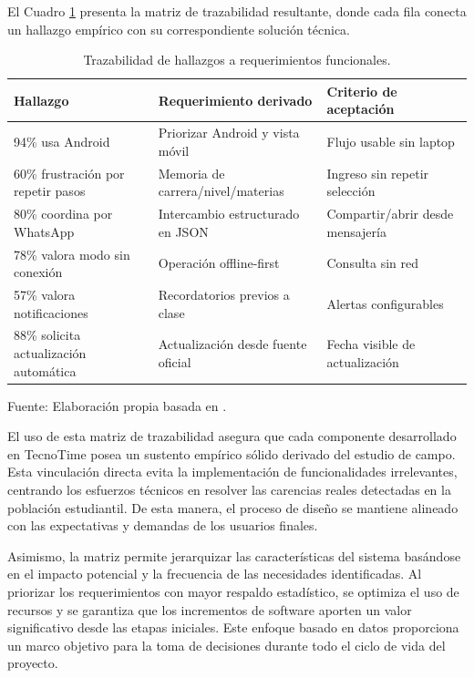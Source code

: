 El Cuadro \ref{tab:derivacion_req} presenta la matriz de trazabilidad resultante, donde cada fila conecta un hallazgo empírico con su correspondiente solución técnica.

\begin{table}[H]
\centering
\begin{tabularx}{\linewidth}{p{5.0cm} p{7.5cm} p{3.5cm}}
\toprule
Hallazgo & Requerimiento derivado & Criterio de aceptación \\
\midrule
94\% usa Android & Priorizar Android y vista móvil & Flujo usable sin laptop \\
60\% frustración por repetir pasos & Memoria de carrera/nivel/materias & Ingreso sin repetir selección \\
80\% coordina por WhatsApp & Intercambio estructurado en JSON & Compartir/abrir desde mensajería \\
78\% valora modo sin conexión & Operación offline-first & Consulta sin red \\
57\% valora notificaciones & Recordatorios previos a clase & Alertas configurables \\
88\% solicita actualización automática & Actualización desde fuente oficial & Fecha visible de actualización \\
\bottomrule
\end{tabularx}
\caption{Trazabilidad de hallazgos a requerimientos funcionales.}\label{tab:derivacion_req}
\small{Fuente: Elaboración propia basada en \cite{encuesta_fcyt_2025}.}
\end{table}

El uso de esta matriz de trazabilidad asegura que cada componente desarrollado en TecnoTime posea un sustento empírico sólido derivado del estudio de campo. Esta vinculación directa evita la implementación de funcionalidades irrelevantes, centrando los esfuerzos técnicos en resolver las carencias reales detectadas en la población estudiantil. De esta manera, el proceso de diseño se mantiene alineado con las expectativas y demandas de los usuarios finales.

Asimismo, la matriz permite jerarquizar las características del sistema basándose en el impacto potencial y la frecuencia de las necesidades identificadas. Al priorizar los requerimientos con mayor respaldo estadístico, se optimiza el uso de recursos y se garantiza que los incrementos de software aporten un valor significativo desde las etapas iniciales. Este enfoque basado en datos proporciona un marco objetivo para la toma de decisiones durante todo el ciclo de vida del proyecto.


